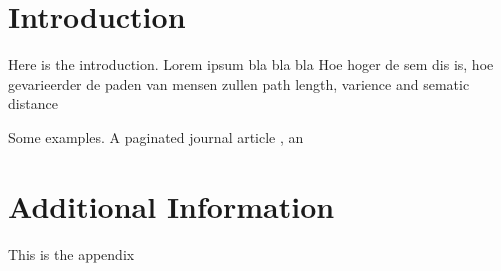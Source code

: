 \documentclass[sigconf]{acmart}
\begin{document}

\maketitle

\section{Introduction}
Here is the introduction. Lorem ipsum bla bla bla
Hoe hoger de sem dis is, hoe gevarieerder de paden van mensen zullen
path length, varience and sematic distance


Some examples.  A paginated journal article \cite{Abril07}, an





\appendix

\section{Additional Information}
This is the appendix
\end{document}
